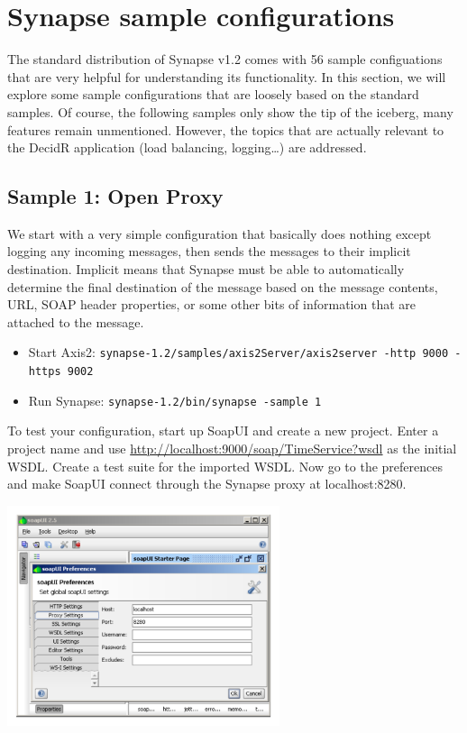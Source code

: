 \section{Synapse sample configurations}
\label{chap:synapse-sample-configurations}
\lstset{frame=single,
	    basicstyle=\tiny,
	    numbers=left,                   
		numberstyle=\tiny, 
	    commentstyle=\textit,
	    breaklines=true}

The standard distribution of Synapse v1.2 comes with 56 sample configuations that
are very helpful for understanding its functionality. In this section, we will
explore some sample configurations that are loosely based on the standard
samples. Of course, the following samples only show the tip of the iceberg, many
features remain unmentioned. However, the topics that are actually relevant to
the DecidR application (load balancing, logging\ldots) are addressed.

\subsection{Sample 1: Open Proxy}
\label{sec:sample-1}
We start with a very simple configuration that basically does nothing except
logging any incoming messages, then sends the messages to their implicit
destination. Implicit means that Synapse must be able to automatically
determine the final destination of the message based on the message contents,
URL, SOAP header properties, or some other bits of information that are attached to
the message.
\begin{itemize}
  \item Start Axis2: \texttt{synapse-1.2/samples/axis2Server/axis2server -http
  9000 -https 9002}
  \item Run Synapse: \texttt{synapse-1.2/bin/synapse -sample 1}
\end{itemize}

\lstset{caption=, label=sample-1-xml}


To test your configuration, start up SoapUI and create a new project. Enter a
project name and use \url{http://localhost:9000/soap/TimeService?wsdl} as the
initial WSDL. Create a test suite for the imported WSDL. Now go to the
preferences and make SoapUI connect through the Synapse proxy at localhost:8280.

\begin{center}
\includegraphics[width=8cm]{figures/soapui-proxy.pdf}
\end{center}

